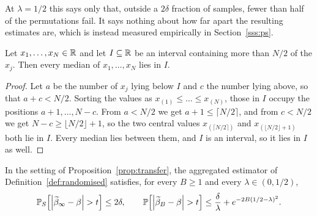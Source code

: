 At $\lambda = 1/2$ this says only that, outside a $2\delta$ fraction of samples, fewer than half of the permutations fail. It says nothing about how far apart the resulting estimates are, which is instead measured empirically in Section~\ref{sss:ps}.

\begin{lemma}
\label{lem:majority}
    Let $x_1,\dots,x_N \in \mathbb{R}$ and let $I \subseteq \mathbb{R}$ be an interval containing more than $N/2$ of the $x_j$. Then every median of $x_1,\dots,x_N$ lies in $I$.
\end{lemma}

\begin{proof}
    Let $a$ be the number of $x_j$ lying below $I$ and $c$ the number lying above, so that $a + c < N/2$. Sorting the values as $x_{(1)} \leq \dots \leq x_{(N)}$, those in $I$ occupy the positions $a+1,\dots,N-c$. From $a < N/2$ we get $a + 1 \leq \lceil N/2 \rceil$, and from $c < N/2$ we get $N - c \geq \lfloor N/2 \rfloor + 1$, so the two central values $x_{(\lceil N/2 \rceil)}$ and $x_{(\lfloor N/2 \rfloor + 1)}$ both lie in $I$. Every median lies between them, and $I$ is an interval, so it lies in $I$ as well.
\end{proof}

\begin{theorem}
\label{thm:aggregation}
    In the setting of Proposition~\ref{prop:transfer}, the aggregated estimator of Definition~\ref{def:randomised} satisfies, for every $B \geq 1$ and every $\lambda \in (0,1/2)$,
    \begin{equation}
    \label{eq:agg_bound}
        \operatorname{\mathbb{P}}_S\!\left[\left|\widetilde{\beta}_\infty - \beta\right| > t\right] \leq 2\delta ,
        \qquad
        \operatorname{\mathbb{P}}\!\left[\left|\widetilde{\beta}_B - \beta\right| > t\right] \leq \frac{\delta}{\lambda} + e^{-2B(1/2-\lambda)^2}.
    \end{equation}
\end{theorem}

